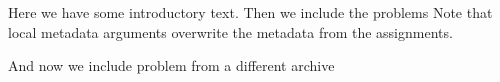 \begin{assignment}[title=Introduction,given=April 24.,due=May 03.]
  Here we have some introductory text. Then we include the problems
  Note that local metadata arguments overwrite the metadata from the assignments.

  And now we include problem from  a different archive
\end{assignment}

